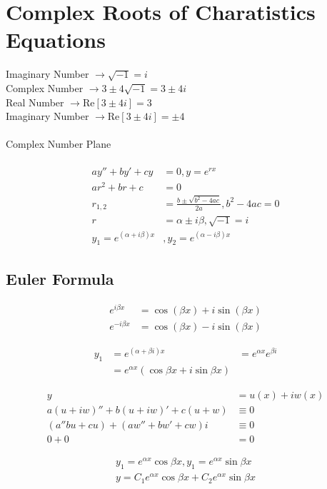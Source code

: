 \documentclass[10pt, letterpaper]{article}
\begin{document}
\section{Complex Roots of Charatistics Equations}
Imaginary Number $\rightarrow \sqrt{-1} = i$\\
Complex Number $\rightarrow 3 \pm 4\sqrt{-1} = 3 \pm 4i$\\
Real Number $\rightarrow \text{Re}[3\pm4i] = 3$\\
Imaginary Number $\rightarrow \text{Re}[3\pm4i] = \pm4$\\
\\
Complex Number Plane\\
\\
\begin{align*}
ay''+by'+cy &= 0, y = e^{rx}\\
ar^2+br+c &= 0\\
r_{1,2} &= \frac{b \pm \sqrt{b^2-4ac}}{2a}, b^2-4ac=0\\
r &= \alpha \pm i\beta, \sqrt{-1} = i\\
y_1=e^{(\alpha+i\beta)x} &, y_2=e^{(\alpha-i\beta)x}
\end{align*}

\subsection{Euler Formula}
\begin{align*}
e^{i\beta x} &= \cos(\beta x) + i\sin(\beta x)\\
e^{-i\beta x} &= \cos(\beta x) - i\sin(\beta x)
\end{align*}

\begin{align*}
y_1 &= e^{(\alpha+\beta i)x} &= e^{\alpha x}e^{\beta i}\\
&= e^{\alpha x} (\cos \beta x + i\sin \beta x)
\end{align*}

\begin{align*}
y &= u(x) + iw(x)\\
a(u+iw)'' + b(u+iw)' + c(u+w) &\equiv 0\\
(a'' bu + cu) + (aw'' + bw' + cw)i &\equiv 0\\
0+0 &= 0
\end{align*}

\begin{align*}
y_1 = e^{\alpha x} \cos \beta x, y_1 = e^{\alpha x} \sin \beta x\\
y = C_1 e^{\alpha x} \cos{\beta x} + C_2 e^{\alpha x} \sin \beta x\\
\end{align*}
\end{document}
